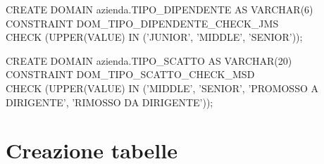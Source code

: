 \begin{flushleft}
\begin{description}
                    \vspace{0.5cm}
                                
                    \item CREATE DOMAIN azienda.TIPO\_DIPENDENTE AS VARCHAR(6)\\
                            CONSTRAINT DOM\_TIPO\_DIPENDENTE\_CHECK\_JMS\\
                            CHECK (UPPER(VALUE) IN ('JUNIOR', 'MIDDLE', 'SENIOR'));

                    \vspace{0.5cm}
                            
                    \item CREATE DOMAIN azienda.TIPO\_SCATTO AS VARCHAR(20)\\
                            CONSTRAINT DOM\_TIPO\_SCATTO\_CHECK\_MSD\\
                                CHECK (UPPER(VALUE) IN ('MIDDLE', 'SENIOR', 'PROMOSSO A DIRIGENTE', 'RIMOSSO DA DIRIGENTE'));
                \end{description}
            \end{flushleft}
        \normalfont

\newpage

    \section{Creazione tabelle}
